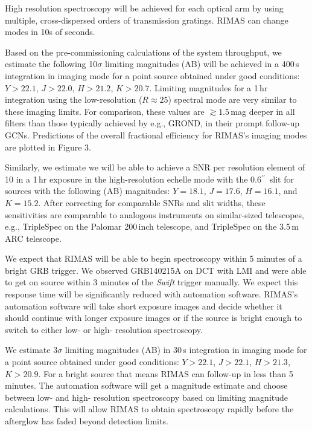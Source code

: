 \documentclass[letterpaper,11pt]{article}
\newcommand{\arcsec}{\mbox{$^{\prime\prime}$}}%
\begin{document}
High resolution spectroscopy will be achieved for each optical arm by using 
multiple, cross-dispersed orders of transmission gratings.  RIMAS
can change modes in 10s of seconds.

\smallskip

Based on the pre-commissioning calculations of the system throughput, we estimate 
the following 10$\sigma$ limiting magnitudes (AB) will be achieved in a 400\,s
integration in imaging mode for a point source obtained under good 
conditions: $Y > 22.1$, $J > 22.0$, $H > 21.2$, $K > 20.7$.  Limiting
magnitudes for a 1\,hr integration using the low-resolution ($R \approx 25$)
spectral mode are very similar to these imaging limits.  For comparison, 
these values are $\gtrsim 1.5$\,mag deeper in all filters than those typically 
achieved by e.g., GROND, in their prompt follow-up GCNs. Predictions of the overall
fractional efficiency for RIMAS's imaging modes are plotted in Figure 3.

Similarly, we estimate we will be able to achieve a SNR per resolution element of 
10 in a 1\,hr exposure in the high-resolution echelle mode with the 0.6\arcsec\ 
slit for sources with the following (AB) magnitudes: $Y = 18.1$, $J = 17.6$, 
$H = 16.1$, and $K = 15.2$.  After correcting for comparable SNRs and slit
widths, these sensitivities are comparable to analogous instruments on 
similar-sized telescopes, e.g., TripleSpec on the Palomar 200\,inch telescope, and
TripleSpec on the 3.5\,m ARC telescope.

\smallskip

We expect that RIMAS will be able to begin spectroscopy within 5 minutes of a bright GRB trigger.
We observed GRB140215A on DCT with LMI and were able to get on source 
within 3 minutes of the \textit{Swift} trigger manually.  We expect this response time will be significantly reduced with 
automation software.  RIMAS's automation software will take short exposure images and 
decide whether it should continue with longer exposure images or if the source is bright 
enough to switch to either low- or high- resolution spectroscopy.

We estimate 3$\sigma$ limiting magnitudes (AB) in 30\,s integration 
in imaging mode for a point source obtained under good conditions: 
$Y > 22.1$, $J > 22.1$, $H > 21.3$, $K > 20.9$.  For a bright source that means RIMAS can
follow-up in less than 5 minutes.  The automation software will get a magnitude estimate and 
choose between low- and high- resolution spectroscopy based on limiting magnitude calculations.
This will allow RIMAS to obtain spectroscopy rapidly before the afterglow has faded beyond detection limits.
\end{document}
